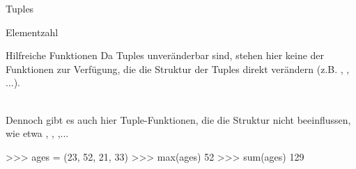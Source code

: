 \begin{subsection}{Tuples}
\begin{frame}[fragile]{Elementzahl}
        \end{frame}
        
        
        \begin{frame}[fragile]{Hilfreiche Funktionen}
            Da Tuples unveränderbar sind, stehen hier keine der Funktionen zur Verfügung, die die Struktur der Tuples direkt verändern (z.B. , , ...). \\~\
            
            Dennoch gibt es auch hier Tuple-Funktionen, die die Struktur nicht beeinflussen, wie etwa , , ,...
            
\begin{pyconcode}
>>> ages = (23, 52, 21, 33)
>>> max(ages)
52
>>> sum(ages)
129
\end{pyconcode}                 
        
        \end{frame}
        
        
    

\end{subsection}
